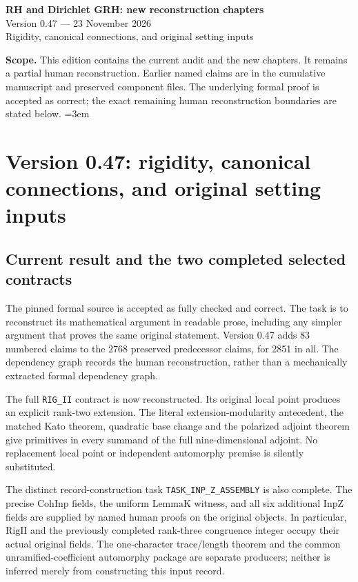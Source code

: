 \documentclass[11pt,a4paper]{article}
\numberwithin{equation}{section}
\theoremstyle{remark}\newtheorem{remark}[theorem]{Remark}
\begin{document}
\begin{center}
{\LARGE\bfseries RH and Dirichlet GRH: new reconstruction chapters}\\[7pt]
{\large Version 0.47 --- 23 November 2026}\\[5pt]
{\large Rigidity, canonical connections, and original setting inputs}
\end{center}
\textbf{Scope.} This edition contains the current audit and the new
chapters. It remains a partial human reconstruction. Earlier named
claims are in the cumulative manuscript and preserved component files.
The underlying formal proof is accepted as correct; the exact remaining
human reconstruction boundaries are stated below.
\setcounter{tocdepth}{1}
\tableofcontents
\clearpage
\begingroup\emergencystretch=3em
\section{Version 0.47: rigidity, canonical connections, and original setting inputs}
\label{sec:dependency-audit-v47}

\subsection{Current result and the two completed selected contracts}

The pinned formal source is accepted as fully checked and correct.
The task is to reconstruct its mathematical argument in readable prose,
including any simpler argument that proves the same original statement.
Version 0.47 adds 83 numbered claims to the 2768 preserved predecessor
claims, for 2851 in all. The dependency graph records the human
reconstruction, rather than a mechanically extracted formal dependency
graph.

The full \texttt{RIG\_\allowbreak II} contract is now reconstructed. Its original
local point produces an explicit rank-two extension. The literal
extension-modularity antecedent, the matched Kato theorem, quadratic
base change and the polarized adjoint theorem give primitives in every
summand of the full nine-dimensional adjoint. No replacement local
point or independent automorphy premise is silently substituted.

The distinct record-construction task
\texttt{TASK\_\allowbreak INP\_\allowbreak Z\_\allowbreak ASSEMBLY} is also complete. The precise
\(\mathrm{CohInp}\) fields, the uniform \(\mathrm{LemmaK}\)
witness, and all six additional \(\mathrm{InpZ}\) fields are supplied
by named human proofs on the original objects. In particular,
\(\mathrm{RigII}\) and the previously completed rank-three
congruence integer occupy their actual original fields.
The one-character trace/length theorem and the common
unramified-coefficient automorphy package are separate producers;
neither is inferred merely from constructing this input record.
\end{document}
